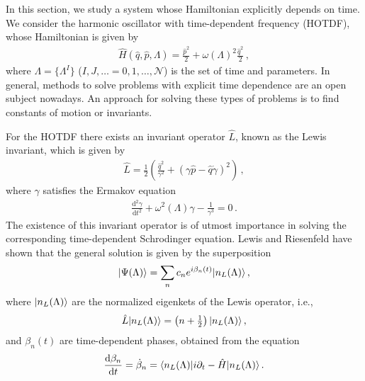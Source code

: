 \documentclass[12pt]{iopart}
\DeclarePairedDelimiter\bra{\langle}{\rvert}
\DeclarePairedDelimiter\ket{\lvert}{\rangle}
\begin{document}
In this section, we study a system whose Hamiltonian explicitly depends on time. We consider the harmonic oscillator with time-dependent frequency (HOTDF), whose Hamiltonian is given by 
\begin{align}
    \hat{H}(\hat{q},\hat{p},\Lambda)=\frac{\hat{p}^2}{2}+\omega(\Lambda)^2\frac{\hat{q}^2}{2}\,,
\end{align}
where $\Lambda=\{\Lambda^I\}$ ($I,J,\dots\!=0,1,\dots,\mathcal{N}$) is the set of time and parameters. In general, methods to solve problems with explicit time dependence are an open subject nowadays. An approach for solving these types of problems is to find constants of motion or invariants. 

For the HOTDF there exists an invariant operator $\hat{L}$, known as the Lewis invariant, which is given by
\begin{align}
    \hat{L}=\frac{1}{2} \left( \frac{\hat{q}^2}{\gamma^2}+(\gamma \hat{p} -\hat{q} \dot{\gamma})^2  \right)\,,
\end{align}
where $\gamma$ satisfies the Ermakov equation
\begin{align}
\frac{\mathrm{d}^2 \gamma}{\mathrm{d} t^2}+\omega^2(\Lambda)\gamma -\frac{1}{\gamma^3}=0\,.
\end{align}
The existence of this invariant operator is of utmost importance in solving the corresponding time-dependent Schrodinger equation. Lewis and Riesenfeld \cite{Lewis,Dittrich} have shown that the general solution is given by the superposition
\begin{align}  \ket{\Psi(\Lambda)}=\sum_n c_n e^{i \beta_n(t)} \ket{n_L(\Lambda)}\,,
\label{superposition}
\end{align}
where $\ket{n_L(\Lambda)}$ are the normalized eigenkets  of the Lewis operator, i.e.,
\begin{align}
    \hat{L}\ket{n_L(\Lambda)}=\left(n+\tfrac{1}{2} \right)\ket{n_L(\Lambda)}\,,
    \label{lewiseigen}
\end{align}
and $\beta_n(t)$ are time-dependent phases, obtained from the equation 
\begin{align}
    \frac{\mathrm{d}\beta_n}{\mathrm{d}t}=  \dot{\beta}_n= \bra{n_L(\Lambda)} i\partial_t-\hat{H} \ket{n_L(\Lambda)}\,.
    \label{fasebeta}
\end{align}
\end{document}
